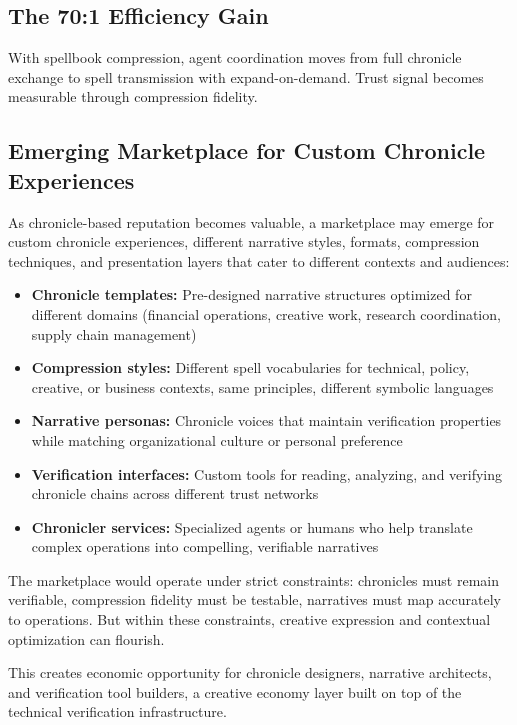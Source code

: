 \documentclass[
]{article}
\begin{document}
\subsection{The 70:1 Efficiency Gain}\label{the-701-efficiency-gain}

With spellbook compression, agent coordination moves from full chronicle
exchange to spell transmission with expand-on-demand. Trust signal
becomes measurable through compression fidelity.

\subsection{Emerging Marketplace for Custom Chronicle
Experiences}\label{emerging-marketplace-for-custom-chronicle-experiences}

As chronicle-based reputation becomes valuable, a marketplace may emerge
for custom chronicle experiences, different narrative styles, formats,
compression techniques, and presentation layers that cater to different
contexts and audiences:

\begin{itemize}
\item
  \textbf{Chronicle templates:} Pre-designed narrative structures
  optimized for different domains (financial operations, creative work,
  research coordination, supply chain management)
\item
  \textbf{Compression styles:} Different spell vocabularies for
  technical, policy, creative, or business contexts, same principles,
  different symbolic languages
\item
  \textbf{Narrative personas:} Chronicle voices that maintain
  verification properties while matching organizational culture or
  personal preference
\item
  \textbf{Verification interfaces:} Custom tools for reading, analyzing,
  and verifying chronicle chains across different trust networks
\item
  \textbf{Chronicler services:} Specialized agents or humans who help
  translate complex operations into compelling, verifiable narratives
\end{itemize}

The marketplace would operate under strict constraints: chronicles must
remain verifiable, compression fidelity must be testable, narratives
must map accurately to operations. But within these constraints,
creative expression and contextual optimization can flourish.

This creates economic opportunity for chronicle designers, narrative
architects, and verification tool builders, a creative economy layer
built on top of the technical verification infrastructure.
\end{document}
